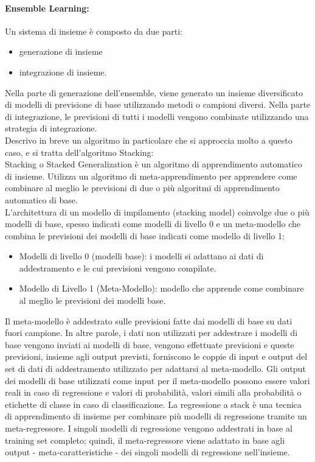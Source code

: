 \documentclass[12pt,a4paper]{report}
\begin{document}
\paragraph*{Ensemble Learning:}
Un sistema di insieme è composto da due parti: \cite{towards:demandForecast}
\begin{itemize}
    \item generazione di insieme
    \item integrazione di insieme.
\end{itemize}
Nella parte di generazione dell'ensemble, viene generato un insieme diversificato di modelli di previsione di base utilizzando metodi o campioni diversi. Nella parte di integrazione, le previsioni di tutti i modelli vengono combinate utilizzando una strategia di integrazione.\\

Descrivo in breve un algoritmo in particolare che si approccia molto a questo caso, e si tratta dell'algoritmo Stacking:\\
Stacking o Stacked Generalization è un algoritmo di apprendimento automatico di insieme. Utilizza un algoritmo di meta-apprendimento per apprendere come combinare al meglio le previsioni di due o più algoritmi di apprendimento automatico di base.\\
L'architettura di un modello di impilamento (stacking model) coinvolge due o più modelli di base, spesso indicati come modelli di livello 0 e un meta-modello che combina le previsioni dei modelli di base indicati come modello di livello 1:
\begin{itemize}
    \item Modelli di livello 0 (modelli base): i modelli si adattano ai dati di addestramento e le cui previsioni vengono compilate.
    \item Modello di Livello 1 (Meta-Modello): modello che apprende come combinare al meglio le previsioni dei modelli base.
\end{itemize}
Il meta-modello è addestrato sulle previsioni fatte dai modelli di base su dati fuori campione. In altre parole, i dati non utilizzati per addestrare i modelli di base vengono inviati ai modelli di base, vengono effettuate previsioni e queste previsioni, insieme agli output previsti, forniscono le coppie di input e output del set di dati di addestramento utilizzato per adattarsi al meta-modello. Gli output dei modelli di base utilizzati come input per il meta-modello possono essere valori reali in caso di regressione e valori di probabilità, valori simili alla probabilità o etichette di classe in caso di classificazione.
La regressione a stack è una tecnica di apprendimento di insieme per combinare più modelli di regressione tramite un meta-regressore. I singoli modelli di regressione vengono addestrati in base al training set completo; quindi, il meta-regressore viene adattato in base agli output - meta-caratteristiche - dei singoli modelli di regressione nell'insieme.\\
\end{document}
